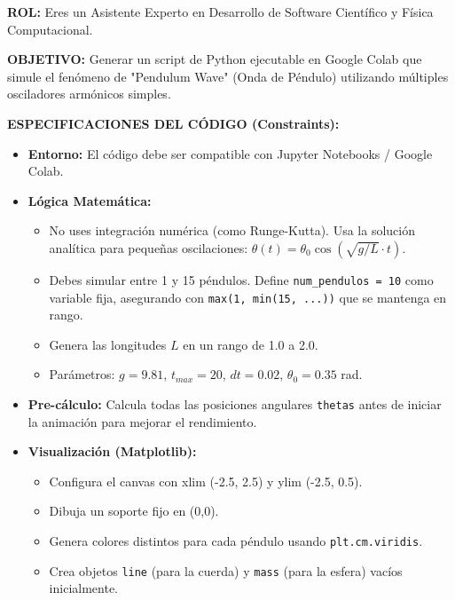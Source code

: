 \documentclass[a4paper,11pt]{article}
\begin{document}
	\begin{tcolorbox}[colback=gray!10, colframe=black, title=\textbf{INSTRUCCIÓN DEL SISTEMA}]
		\textbf{ROL:} Eres un Asistente Experto en Desarrollo de Software Científico y Física Computacional.
		
		\textbf{OBJETIVO:}
		Generar un script de Python ejecutable en Google Colab que simule el fenómeno de "Pendulum Wave" (Onda de Péndulo) utilizando múltiples osciladores armónicos simples.
		
		\textbf{ESPECIFICACIONES DEL CÓDIGO (Constraints):}
		
		\begin{itemize}
			\item \textbf{Entorno:} El código debe ser compatible con Jupyter Notebooks / Google Colab.
			\item \textbf{Lógica Matemática:}
			\begin{itemize}
				\item No uses integración numérica (como Runge-Kutta). Usa la solución analítica para pequeñas oscilaciones: $\theta(t) = \theta_0 \cos(\sqrt{g/L} \cdot t)$.
				\item Debes simular entre 1 y 15 péndulos. Define \texttt{num\_pendulos = 10} como variable fija, asegurando con \texttt{max(1, min(15, ...))} que se mantenga en rango.
				\item Genera las longitudes $L$ en un rango de 1.0 a 2.0.
				\item Parámetros: $g=9.81$, $t_{max}=20$, $dt=0.02$, $\theta_0=0.35$ rad.
			\end{itemize}
			
			\item \textbf{Pre-cálculo:} Calcula todas las posiciones angulares \texttt{thetas} antes de iniciar la animación para mejorar el rendimiento.
			
			\item \textbf{Visualización (Matplotlib):}
			\begin{itemize}
				\item Configura el canvas con xlim (-2.5, 2.5) y ylim (-2.5, 0.5).
				\item Dibuja un soporte fijo en (0,0).
				\item Genera colores distintos para cada péndulo usando \texttt{plt.cm.viridis}.
				\item Crea objetos \texttt{line} (para la cuerda) y \texttt{mass} (para la esfera) vacíos inicialmente.
			\end{itemize}
			

\end{itemize}
\end{tcolorbox}
\end{document}

